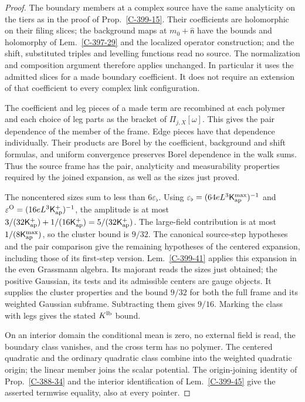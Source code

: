 \documentclass[11pt,letterpaper,reqno]{amsart}
\theoremstyle{definition}
\theoremstyle{remark}
\begin{document}
\begin{proof}
The boundary members at a complex source have the same
analyticity on the tiers as in the proof of
Prop.~\ref{C-399-15}. Their coefficients are
holomorphic on their filing slices; the background
maps at $m_0+\widehat{\mathsf n}$ have the bounds and
holomorphy of Lem.~\ref{C-397-29} and the localized
operator construction; and the shift,
substituted triples and levelling functions read no
source. The normalization and composition argument
therefore applies unchanged. In particular it uses
the admitted slices for a made boundary coefficient.
It does not require an extension of that coefficient
to every complex link configuration.

The coefficient and leg pieces of a made term are
recombined at each polymer and each choice of leg parts
as the bracket of $\Pi_{j,X}[\omega]$. This gives the
pair dependence of the member of the frame. Edge
pieces have that dependence individually. Their
products are Borel by the coefficient, background and
shift formulas, and uniform convergence preserves
Borel dependence in the walk sums. Thus the source
frame has the pair, analyticity and measurability
properties required by the joined expansion, as well
as the sizes just proved.

The noncentered sizes sum to less than $6\varepsilon_\flat$.
Using $\varepsilon_\flat=(64eL^3\mathsf K_{\rm ap}^{\max})^{-1}$
and $\varepsilon^{\rm O}=(16eL^3\mathsf K_{\rm ap}^{+})^{-1}$,
the amplitude is at most
$3/(32\mathsf K_{\rm ap}^+)+1/(16\mathsf K_{\rm ap}^+)
=5/(32\mathsf K_{\rm ap}^+)$. The large-field contribution
is at most $1/(8\mathsf K_{\rm ap}^{\max})$, so the cluster
bound is $9/32$. The canonical source-step hypotheses and the
pair comparison give the remaining hypotheses of the centered
expansion, including those of its first-step version.
Lem.~\ref{C-399-41} applies this expansion in the even
Grassmann algebra. Its majorant reads the sizes just obtained;
the positive Gaussian, its tests and its admissible centers
are gauge objects. It supplies the cluster properties and the
bound $9/32$ for both the full frame and its weighted Gaussian
subframe. Subtracting them gives $9/16$. Marking the class
with legs gives the stated $K^{\rm lb}$ bound.

On an interior domain the conditional mean is zero, no external
field is read, the boundary class vanishes, and the cross term
has no polymer. The centered quadratic and the ordinary
quadratic class combine into the weighted quadratic origin;
the linear member joins the scalar potential. The origin-joining
identity of Prop.~\ref{C-388-34} and the interior
identification of Lem.~\ref{C-399-45} give the asserted
termwise equality, also at every pointer.
\end{proof}
\end{document}
